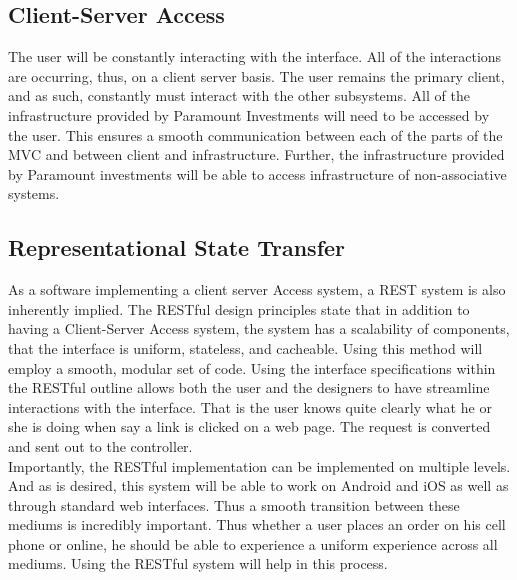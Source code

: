 \subsection{Client-Server Access}

The user will be constantly interacting with the interface.
All of the interactions are occurring, thus, on a client
server basis. The user remains the primary client, and as
such, constantly must interact with the other subsystems.
All of the infrastructure provided by Paramount Investments
will need to be accessed by the user. This ensures a smooth
communication between each of the parts of the MVC and between
client and infrastructure. Further, the infrastructure provided
by Paramount investments will be able to access infrastructure
of non-associative systems.

\subsection{Representational State Transfer}

As a software implementing a client server Access system,
a REST system is also inherently implied. The RESTful design
principles state that in addition to having a Client-Server
Access system, the system has a scalability of components,
that the interface is uniform, stateless, and cacheable.
Using this method will employ a smooth, modular set of code.
Using the interface specifications within the RESTful outline
allows both the user and the designers to have streamline
interactions with the interface. That is the user knows quite
clearly what he or she is doing when say a link is clicked on
a web page. The request is converted and sent out to the controller.\\

Importantly, the RESTful implementation can be implemented on
multiple levels. And as is desired, this system will be able to
work on Android and iOS as well as through standard web interfaces.
Thus a smooth transition between these mediums is incredibly
important. Thus whether a user places an order on his cell phone
or online, he should be able to experience a uniform experience
across all mediums. Using the RESTful system will help in this process.


